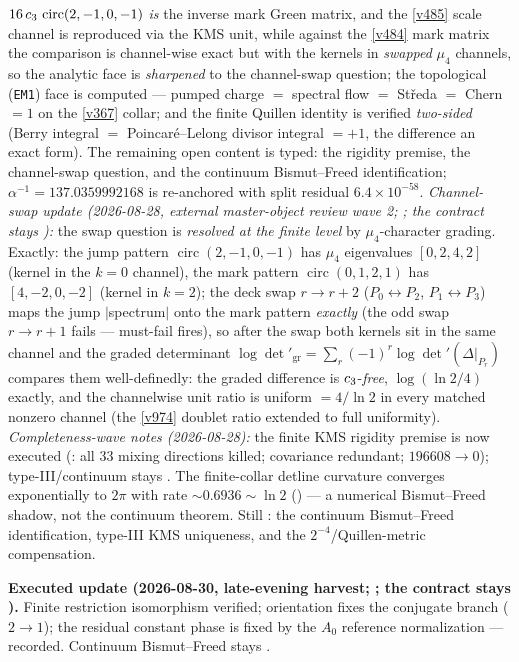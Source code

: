 $16\,c_3\,\operatorname{circ}(2,-1,0,-1)$ \emph{is} the inverse mark Green matrix, and the
\vref{v485} scale channel is reproduced via the KMS unit, while against the \vref{v484} mark
matrix the comparison is channel-wise exact but with the kernels in \emph{swapped} $\mu_4$
channels, so the analytic face is \emph{sharpened} to the channel-swap question; the
topological (\texttt{EM1}) face is computed --- pumped charge $=$ spectral flow $=$
St\v{r}eda $=$ Chern $=1$ on the \vref{v367} collar; and the finite Quillen identity is
verified \emph{two-sided} (Berry integral $=$ Poincar\'e--Lelong divisor integral $=+1$, the
difference an exact form). The remaining open content is typed: the rigidity premise, the
channel-swap question, and the continuum Bismut--Freed identification;
$\alpha^{-1}=137.0359992168$ is re-anchored with split residual $6.4\times10^{-58}$.
\emph{Channel-swap update (2026-08-28, external master-object review wave 2;
; the contract stays \mO):} the swap question is
\emph{resolved at the finite level} by $\mu_4$-character grading.  Exactly: the jump pattern
$\operatorname{circ}(2,-1,0,-1)$ has $\mu_4$ eigenvalues $[0,2,4,2]$ (kernel in the $k{=}0$
channel), the mark pattern $\operatorname{circ}(0,1,2,1)$ has $[4,-2,0,-2]$ (kernel in
$k{=}2$); the deck swap $r\to r{+}2$ ($P_0\leftrightarrow P_2$, $P_1\leftrightarrow P_3$) maps
the jump $|$spectrum$|$ onto the mark pattern \emph{exactly} (the odd swap $r\to r{+}1$ fails
--- must-fail fires), so after the swap both kernels sit in the same channel and the graded
determinant $\log\det'_{\mathrm{gr}}=\sum_r(-1)^r\log\det'(\Delta|_{P_r})$ compares them well-definedly:
the graded difference is $c_3$-\emph{free}, $\log(\ln 2/4)$ exactly, and the channelwise
unit ratio is uniform $=4/\ln 2$ in every matched nonzero channel (the \vref{v974} doublet
ratio extended to full uniformity).  \emph{Completeness-wave notes (2026-08-28):} the finite
KMS rigidity premise is now executed
(: all $33$ mixing directions killed; covariance redundant;
$196608\to 0$); type-III/continuum stays \mO.  The finite-collar detline curvature converges
exponentially to $2\pi$ with rate $\sim 0.6936\sim\ln 2$
() --- a numerical Bismut--Freed shadow, not the continuum
theorem.  Still \mO: the continuum Bismut--Freed identification, type-III KMS uniqueness,
and the $2^{-4}$/Quillen-metric compensation.

\par\smallskip\noindent\textbf{Executed update (2026-08-30, late-evening harvest;
; the contract stays \mO).}
Finite restriction isomorphism verified; orientation fixes the conjugate branch
($2\to1$); the residual constant phase is fixed by the $A_0$ reference normalization ---
recorded.  Continuum Bismut--Freed stays \mO.

